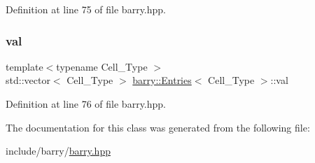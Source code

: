 Definition at line 75 of file barry.\+hpp.

\mbox{\label{classbarry_1_1_entries_af2570fcd2f42e9a1704f9c254507284c}} 
\subsubsection{\texorpdfstring{val}{val}}
{\footnotesize\ttfamily template$<$typename Cell\+\_\+\+Type $>$ \\
std\+::vector$<$ Cell\+\_\+\+Type $>$ \hyperlink{classbarry_1_1_entries}{barry\+::\+Entries}$<$ Cell\+\_\+\+Type $>$\+::val}



Definition at line 76 of file barry.\+hpp.



The documentation for this class was generated from the following file\+:\begin{DoxyCompactItemize}
\item 
include/barry/\hyperlink{barry_8hpp}{barry.\+hpp}\end{DoxyCompactItemize}
